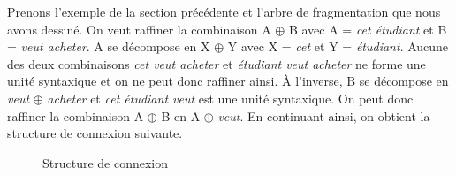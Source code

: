 Prenons l’exemple de la section précédente et l’arbre de fragmentation que nous avons dessiné. On veut raffiner la combinaison A ${\oplus}$ B avec A = \textit{cet étudiant} et B = \textit{veut acheter}. A se décompose en X ${\oplus}$ Y avec X = \textit{cet} et Y = \textit{étudiant}. Aucune des deux combinaisons \textit{cet veut acheter} et \textit{étudiant veut acheter} ne forme une unité syntaxique et on ne peut donc raffiner ainsi. À l’inverse, B se décompose en \textit{veut} ${\oplus}$ \textit{acheter} et \textit{cet étudiant veut} est une unité syntaxique. On peut donc raffiner la combinaison A ${\oplus}$ B en A ${\oplus}$ \textit{veut}. En continuant ainsi, on obtient la structure de connexion suivante.

\begin{figure}
\caption{\label{fig:}Structure de connexion}
\end{figure}

